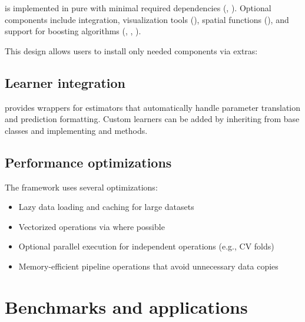 \documentclass[article]{jss}
\newcommand{\fct}[1]{\code{#1()}}
\begin{document}
 is implemented in pure  with minimal required dependencies (, ). Optional components include  integration, visualization tools (), spatial functions (), and support for boosting algorithms (, , ).

This design allows users to install only needed components via extras:

\begin{CodeChunk}
\end{CodeChunk}

\subsection{Learner integration}

 provides wrappers for  estimators that automatically handle parameter translation and prediction formatting. Custom learners can be added by inheriting from base classes and implementing \fct{train} and \fct{predict} methods.

\subsection{Performance optimizations}

The framework uses several optimizations:
\begin{itemize}
\item Lazy data loading and caching for large datasets
\item Vectorized operations via  where possible
\item Optional parallel execution for independent operations (e.g., CV folds)
\item Memory-efficient pipeline operations that avoid unnecessary data copies
\end{itemize}



\section{Benchmarks and applications} \label{sec:benchmarks}
\end{document}
